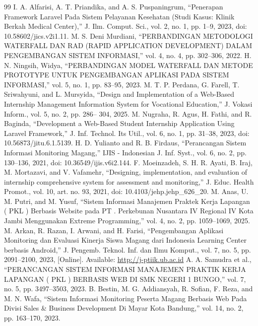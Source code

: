 \begin{thebibliography}{99}
 I. A. Alfarisi, A. T. Priandika, and A. S. Puspaningrum, “Penerapan Framework Laravel Pada Sistem Pelayanan Kesehatan (Studi Kasus: Klinik Berkah Medical Center),” J. Ilm. Comput. Sci., vol. 2, no. 1, pp. 1–9, 2023, doi: 10.58602/jics.v2i1.11.
 M. S. Deni Murdiani, “PERBANDINGAN METODOLOGI WATERFALL DAN RAD (RAPID APPLICATION DEVELOPMENT) DALAM PENGEMBANGAN SISTEM INFORMASI,” vol. 4, no. 4, pp. 302–306, 2022.
 H. N. Ningsih, Widya, “PERBANDINGAN MODEL WATERFALL DAN METODE PROTOTYPE UNTUK PENGEMBANGAN APLIKASI PADA SISTEM INFORMASI,” vol. 5, no. 1, pp. 83–95, 2023.
 M. T. P. Perdana, G. Farell, T. Sriwahyuni, and L. Mursyida, “Design and Implementation of a Web-Based Internship Management Information System for Vocational Education,” J. Vokasi Inform., vol. 5, no. 2, pp. 286– 304, 2025.
 M. Nugraha, R. Agus, H. Fathi, and R. Baginda, “Development a Web-Based Student Internship Application Using Laravel Framework,” J. Inf. Technol. Its Util., vol. 6, no. 1, pp. 31–38, 2023, doi: 10.56873/jitu.6.1.5139.
 H. D. Yulianto and R. B. Firdaus, “Perancangan Sistem Informasi Monitoring Magang,” IJIS - Indonesian J. Inf. Syst., vol. 6, no. 2, pp. 130--136, 2021, doi: 10.36549/ijis.v6i2.144.
 F. Moeinzadeh, S. H. R. Ayati, B. Iraj, M. Mortazavi, and V. Vafamehr, “Designing, implementation, and evaluation of internship comprehensive system for assessment and monitoring,” J. Educ. Health Promot., vol. 10, art. no. 93, 2021, doi: 10.4103/jehp.jehp\_626\_20.
 M. Anas, U. M. Putri, and M. Yusuf, “Sistem Informasi Manajemen Praktek Kerja Lapangan ( PKL ) Berbasis Website pada PT . Perkebunan Nusantara IV Regional IV Kota Jambi Menggunakan Extreme Programming,” vol. 4, no. 2, pp. 1059–1069, 2025.
 M. Arkan, R. Razan, I. Arwani, and H. Farisi, “Pengembangan Aplikasi Monitoring dan Evaluasi Kinerja Siswa Magang dari Indonesia Learning Center berbasis Android,” J. Pengemb. Teknol. Inf. dan Ilmu Komput., vol. 7, no. 5, pp. 2091–2100, 2023, [Online]. Available: \url{http://j-ptiik.ub.ac.id}
 A. A. Samudra et al., “PERANCANGAN SISTEM INFORMASI MANAJEMEN PRAKTIK KERJA LAPANGAN ( PKL ) BERBASIS WEB DI SMK NEGERI 1 BUNGO,” vol. 7, no. 5, pp. 3497–3503, 2023.
 B. Bestin, M. G. Addiansyah, R. Sofian, F. Reza, and M. N. Wafa, “Sistem Informasi Monitoring Peserta Magang Berbasis Web Pada Divisi Sales \& Business Development Di Mayar Kota Bandung,” vol. 14, no. 2, pp. 163–170, 2023.

\end{thebibliography}
